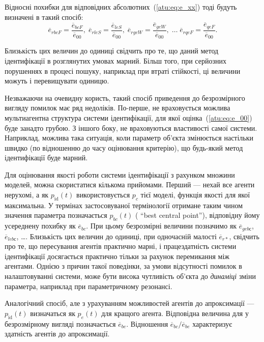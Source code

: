 Відносні похибки для відповідних абсолютних~(\ref{atu:eq:e_xx})
тоді будуть визначені в такий спосіб:
%
\begin{equation}
  \overline{e}_{rbcF} = \frac{\overline{e}_{bcF}}{\overline{e}_{00}}, \;
  \overline{e}_{rleS} = \frac{\overline{e}_{leS}}{\overline{e}_{00}}, \;
  \overline{e}_{rgeW} = \frac{\overline{e}_{geW}}{\overline{e}_{00}},
  \; \ldots \;
  \overline{e}_{rqeF} = \frac{\overline{e}_{qeF}}{\overline{e}_{00}}.
  \label{atu:eq:e_rxx}
\end{equation}

Близькість цих величин до одиниці свідчить про те, що даний метод ідентифікації
в розглянутих умовах марний. Більш того, при серйозних порушеннях в процесі
пошуку, наприклад при втраті стійкості, ці величини можуть і перевищувати
одиницю.

Незважаючи на очевидну користь, такий спосіб приведення до
безрозмірного вигляду помилок має ряд недоліків. По-перше,
не враховується можлива мультиагентна структура системи
ідентифікації, для якої оцінка~(\ref{atu:eq:e_00}) буде занадто
грубою. З іншого боку, не враховуються властивості самої
системи. Наприклад, можлива така ситуація, коли параметр об'єкта
змінюється настільки швидко (по відношенню до часу оцінювання
критерію), що будь-який метод ідентифікації буде марний.

Для оцінювання якості роботи системи ідентифікації з рахунком
множини моделей, можна скористатися кількома прийомами. Перший
--- нехай все агенти нерухомі, а як
$ p_\mathrm{id}(t) $ використовується
$ p_c $ тієї моделі, функція якості для якої максимальна. У термінах
застосовуваної термінології отримане таким чином значення
параметра позначається
$ p_{bc} (t) $ ( ``best central point''), відповідну йому усереднену похибку як
$ \overline{e}_{bc} $. При цьому безрозмірні величини позначимо як
$ \overline{e}_{gebс} $,
$ \overline{e}_{lebс} $, \ldots. Близькість цих величин до одиниці, при
одночасній малості
$ \overline{e}_{r *} $, свідчить про те, що пересування агентів практично
марні, і працездатність системи ідентифікації досягається
практично тільки за рахунок перемикання між агентами. Однією
з причин такої поведінки, за умови відсутності помилок в
налаштовуванні системи, може бути висока чутливість об'єкта до
\textit{динаміці} зміни параметра, наприклад при параметричному
резонансі.

Аналогічний спосіб, але з урахуванням можливостей агентів до
апроксимації ---
$ p_\mathrm{id} (t) $ визначаться як
$ p_e(t)$ для кращого агента. Відповідна величина для
у безрозмірному вигляді позначається
$ \overline{e}_{be} $. Відношення
$ \overline{e}_{bc} / \overline{e}_{be} $ характеризує здатність
агентів до апроксимації.


